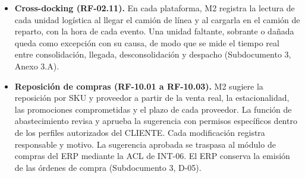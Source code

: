 \begin{itemize}
\item \textbf{Cross-docking (RF-02.11).} En cada plataforma, M2 registra la lectura de cada unidad logística al llegar el camión de línea y al cargarla en el camión de reparto, con la hora de cada evento. Una unidad faltante, sobrante o dañada queda como excepción con su causa, de modo que se mide el tiempo real entre consolidación, llegada, desconsolidación y despacho (Subdocumento 3, Anexo 3.A).
  \item \textbf{Reposición de compras (RF-10.01 a RF-10.03).} M2 sugiere la reposición por SKU y proveedor a partir de la venta real, la estacionalidad, las promociones comprometidas y el plazo de cada proveedor. La función de abastecimiento revisa y aprueba la sugerencia con permisos específicos dentro de los perfiles autorizados del CLIENTE. Cada modificación registra responsable y motivo. La sugerencia aprobada se traspasa al módulo de compras del ERP mediante la ACL de INT-06. El ERP conserva la emisión de las órdenes de compra (Subdocumento 3, D-05).
\end{itemize}

